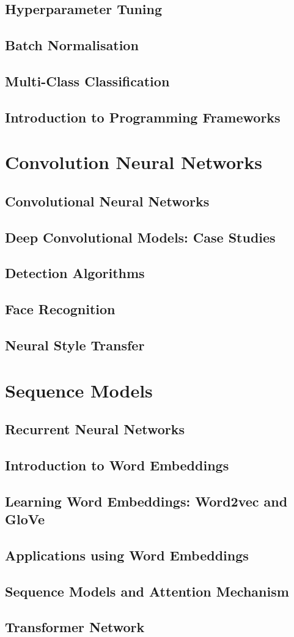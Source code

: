 \subsection{Hyperparameter Tuning}
\subsection{Batch Normalisation}
\subsection{Multi-Class Classification}
\subsection{Introduction to Programming Frameworks}

\section{Convolution Neural Networks}
\subsection{Convolutional Neural Networks}
\subsection{Deep Convolutional Models: Case Studies}
\subsection{Detection Algorithms}
\subsection{Face Recognition}
\subsection{Neural Style Transfer}

\section{Sequence Models}
\subsection{Recurrent Neural Networks}
\subsection{Introduction to Word Embeddings}
\subsection{Learning Word Embeddings: Word2vec and GloVe}
\subsection{Applications using Word Embeddings}
\subsection{Sequence Models and Attention Mechanism}
\subsection{Transformer Network}